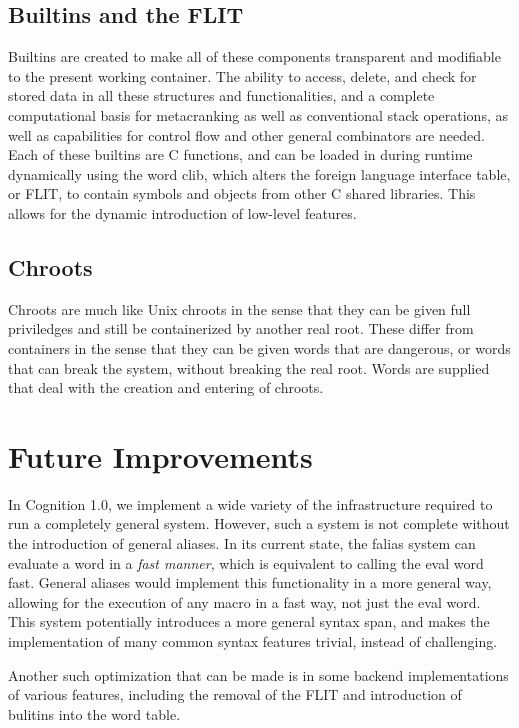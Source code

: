 \documentclass[
	a4paper,
	10pt,
	twoside,
]{LTJournalArticle}
\begin{document}
\subsection{Builtins and the FLIT}
Builtins are created to make all of these components transparent and modifiable to the present working container. The ability
to access, delete, and check for stored data in all these structures and functionalities, and a complete computational basis
for metacranking as well as conventional stack operations, as well as capabilities for control flow and other general
combinators are needed. Each of these builtins are C functions, and can be loaded in during runtime dynamically using the word
clib, which alters the foreign language interface table, or FLIT, to contain symbols and objects from other C shared libraries.
This allows for the dynamic introduction of low-level features.
\subsection{Chroots}
Chroots are much like Unix chroots in the sense that they can be given full priviledges and still be containerized by another
real root. These differ from containers in the sense that they can be given words that are dangerous, or words that can break
the system, without breaking the real root. Words are supplied that deal with the creation and entering of chroots.

\section{Future Improvements}
In Cognition 1.0, we implement a wide variety of the infrastructure required to run a completely general system. However,
such a system is not complete without the introduction of general aliases. In its current state, the falias system can
evaluate a word in a \emph{fast manner}, which is equivalent to calling the eval word fast. General aliases would implement
this functionality in a more general way, allowing for the execution of any macro in a fast way, not just the eval word. This
system potentially introduces a more general syntax span, and makes the implementation of many common syntax features trivial,
instead of challenging.

Another such optimization that can be made is in some backend implementations of various features, including the removal
of the FLIT and introduction of bulitins into the word table.
\end{document}
